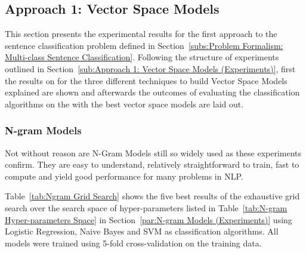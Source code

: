 \clearpage

\subsection{Approach 1: Vector Space Models}
\label{sub:Approach 1: Vector Space Models (Results)}

This section presents the experimental results for the first approach to the sentence classification problem defined in Section~\ref{subs:Problem Formalism: Multi-class Sentence Classification}. Following the structure of experiments outlined in Section~\ref{sub:Approach 1: Vector Space Models (Experiments)}, first the results on for the three different techniques to build Vector Space Models explained are shown and afterwards the outcomes of evaluating the classification algorithms on the with the best vector space models are laid out.

\subsubsection{N-gram Models}

Not without reason are N-Gram Models still so widely used as these experiments confirm. They are easy to understand, relatively straightforward to train, fast to compute and yield good performance for many problems in \gls{NLP}.

Table~\ref{tab:Ngram Grid Search} shows the five best results of the exhaustive grid search over the search space of hyper-parameters listed in Table~\ref{tab:N-gram Hyper-parameters Space} in Section~\ref{par:N-gram Models (Experiments)} using Logistic Regression, Naive Bayes and SVM as classification algorithms. All models were trained using 5-fold cross-validation on the training data.

